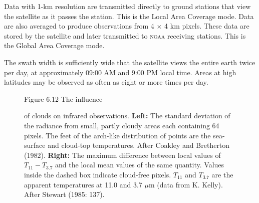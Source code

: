 Data with 1-km resolution are transmitted directly to ground stations
that view the satellite as it passes the station. This is the Local
Area Coverage mode. Data are also averaged to produce observations
from 4 $\times$ 4 km pixels. These data are stored by the satellite
and later transmitted to \textsc{noaa} receiving stations. This is the
Global Area Coverage mode.

The swath width is sufficiently wide that the satellite views the
entire earth twice per day, at approximately 09:00 AM and 9:00 PM
local time. Areas at high latitudes may be observed as often as eight
or more times per day.

\begin{figure}[b!]
\vspace{-2ex}
\footnotesize
Figure 6.12 The influence \rule{0pt}{4ex}of clouds on infrared
observations.  \textbf{Left:} The standard deviation of the radiance
from small, partly cloudy areas each containing 64 pixels. The feet of
the arch-like distribution of points are the sea-surface and cloud-top
temperatures. After Coakley and Bretherton (1982). \textbf{Right:} The
maximum difference between local values of $T_{11} - T_{3.7}$ and the
local mean values of the same quantity. Values inside the dashed box
indicate cloud-free pixels. $T_{11}$ and $T_{3.7}$ are the apparent
temperatures at 11.0 and 3.7 $\mu$m (data from K. Kelly). After
Stewart (1985: 137).
\label{fig:cloudalgo}
\end{figure}

